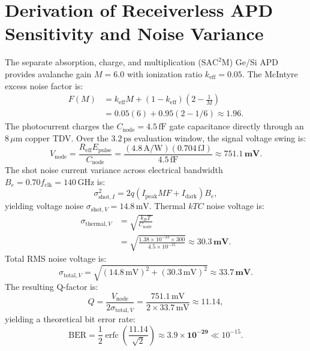 \documentclass[journal]{IEEEtran}
\begin{document}
\section{Derivation of Receiverless APD Sensitivity and Noise Variance}
The separate absorption, charge, and multiplication ($\text{SAC}^2\text{M}$) Ge/Si APD provides avalanche gain $M = 6.0$ with ionization ratio $k_{\text{eff}} = 0.05$. The McIntyre excess noise factor is:
\begin{align}
    F(M) &= k_{\text{eff}} M + (1 - k_{\text{eff}}) \left( 2 - \frac{1}{M} \right) \nonumber \\
    &= 0.05(6) + 0.95(2 - 1/6) \approx \mathbf{1.96}.
\end{align}
The photocurrent charges the $C_{\text{node}} = 4.5\,\text{fF}$ gate capacitance directly through an $8\,\mu\text{m}$ copper TDV. Over the $3.2\,\text{ps}$ evaluation window, the signal voltage swing is:
\begin{equation}
    V_{\text{node}} = \frac{R_{\text{eff}} E_{\text{pulse}}}{C_{\text{node}}} = \frac{(4.8\,\text{A/W}) (0.704\,\text{fJ})}{4.5\,\text{fF}} \approx \mathbf{751.1\,\text{mV}}.
\end{equation}
The shot noise current variance across electrical bandwidth $B_e = 0.70 f_{\text{clk}} = 140\,\text{GHz}$ is:
\begin{equation}
    \sigma_{\text{shot}, I}^2 = 2 q (I_{\text{peak}} M F + I_{\text{dark}}) B_e,
\end{equation}
yielding voltage noise $\sigma_{\text{shot}, V} = 14.8\,\text{mV}$. Thermal $kTC$ noise voltage is:
\begin{align}
    \sigma_{\text{thermal}, V} &= \sqrt{\frac{k_B T}{C_{\text{node}}}} \nonumber \\
    &= \sqrt{\frac{1.38 \times 10^{-23} \times 300}{4.5 \times 10^{-15}}} \approx \mathbf{30.3\,\text{mV}}.
\end{align}
Total RMS noise voltage is:
\begin{equation}
    \sigma_{\text{total}, V} = \sqrt{(14.8\,\text{mV})^2 + (30.3\,\text{mV})^2} \approx \mathbf{33.7\,\text{mV}}.
\end{equation}
The resulting Q-factor is:
\begin{equation}
    Q = \frac{V_{\text{node}}}{2 \sigma_{\text{total}, V}} = \frac{751.1\,\text{mV}}{2 \times 33.7\,\text{mV}} \approx \mathbf{11.14},
\end{equation}
yielding a theoretical bit error rate:
\begin{equation}
    \text{BER} = \frac{1}{2} \operatorname{erfc}\left(\frac{11.14}{\sqrt{2}}\right) \approx \mathbf{3.9 \times 10^{-29}} \ll 10^{-15}.
\end{equation}
\end{document}
